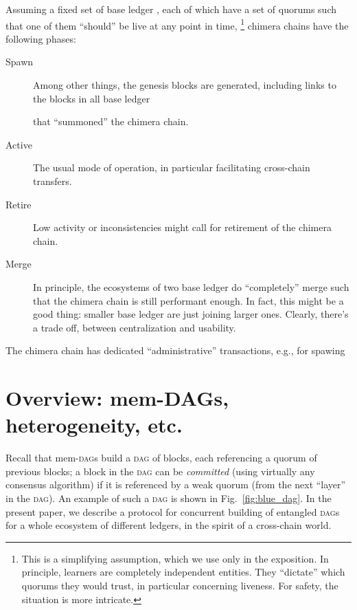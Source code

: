 \documentclass{article}
\theoremstyle{definition}
\newcommand{\base}[1][ ]{%
  base ledger%
  \ifthenelse{\equal{#1}{ }}{}{#1}
}
\newcommand{\Dag}[1][]{\textsc{dag}#1\xspace}
\newcommand{\fig}[1][]{Fig.~}
\begin{document}
Assuming a fixed set of \base[s], 
each of which have a set of quorums
such that one of them “should” be live at any point in time,%
\footnote{%
  This is a simplifying assumption,
  which we use only in the exposition.
  In principle,
  learners are completely independent entities.
  They “dictate” which quorums they would trust,  
  in particular concerning liveness.
  For safety, %
  the situation is more intricate. %
}%
\xspace%
chimera chains have the following phases:
\begin{description}
\item[Spawn] %
  Among other things,
  the genesis blocks are generated,
  including links to the blocks in all \base[s]
  that “summoned” the chimera chain. 

\item[Active]
  The usual mode of operation,
  in particular facilitating cross-chain transfers. 

\item[Retire] 
  Low activity or inconsistencies might call 
  for retirement of the chimera chain. 

\item[Merge]
  In principle,
  the ecosystems of two \base[s] do “completely” merge
  such that the chimera chain is still performant enough.
  In fact,
  this might be a good thing:
  smaller \base[s] are just joining larger ones.
  Clearly,
  there's a trade off,
  between centralization and usability. 
\end{description}

The chimera chain has dedicated “administrative” transactions,
e.g.,
for spawing











\section{Overview: %
  mem-DAGs, heterogeneity, etc.}
\label{sec:overview}

Recall that mem-\Dag[s] build a \Dag of blocks,
each referencing a quorum of previous blocks;
a block in the \Dag can be \emph{committed} 
(using virtually any consensus algorithm)
if it is referenced by a weak quorum (from the next “layer” in the \Dag). 
An example of such a \Dag
is shown in \fig\ref{fig:blue_dag}. 
In the present paper,
we describe a protocol for concurrent building 
of entangled \Dag[s] for a whole ecosystem of different ledgers,
in the spirit of a cross-chain world. 
\end{document}

